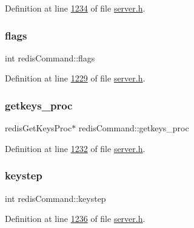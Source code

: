 Definition at line \hyperlink{server_8h_source_l01234}{1234} of file \hyperlink{server_8h_source}{server.\+h}.

\mbox{\label{structredisCommand_ac2f449728b059d5f64079948199dc928}} 
\subsubsection{\texorpdfstring{flags}{flags}}
{\footnotesize\ttfamily int redis\+Command\+::flags}



Definition at line \hyperlink{server_8h_source_l01229}{1229} of file \hyperlink{server_8h_source}{server.\+h}.

\mbox{\label{structredisCommand_ab91d7b447701a9cd5925d93b43df24e9}} 
\subsubsection{\texorpdfstring{getkeys\+\_\+proc}{getkeys\_proc}}
{\footnotesize\ttfamily redis\+Get\+Keys\+Proc$\ast$ redis\+Command\+::getkeys\+\_\+proc}



Definition at line \hyperlink{server_8h_source_l01232}{1232} of file \hyperlink{server_8h_source}{server.\+h}.

\mbox{\label{structredisCommand_a58117d4ef5caddb89e70cac7f98857d9}} 
\subsubsection{\texorpdfstring{keystep}{keystep}}
{\footnotesize\ttfamily int redis\+Command\+::keystep}



Definition at line \hyperlink{server_8h_source_l01236}{1236} of file \hyperlink{server_8h_source}{server.\+h}.

\mbox{\label{structredisCommand_ac0fc65a03ddc4c8c766e2907d72d1d51}} 
